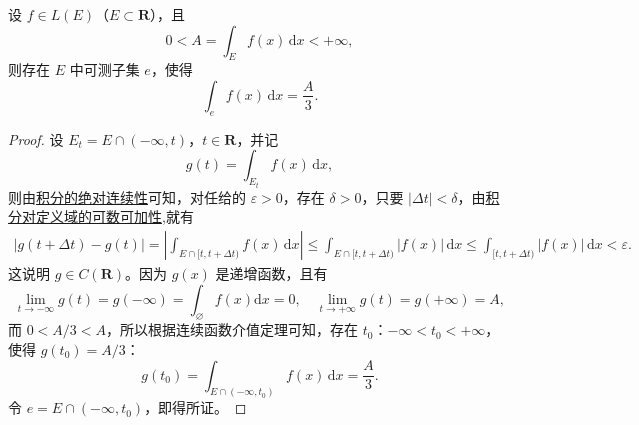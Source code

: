 \documentclass[../../main.tex]{subfiles}
\begin{document}
\begin{corollary}
设 $f \in L(E)$（$E \subset \mathbf{R}$），且
\[
0 < A = \int_E f(x) \, \mathrm{d}x < +\infty,
\]
则存在 $E$ 中可测子集 $e$，使得
\[
\int_e f(x) \, \mathrm{d}x = \frac{A}{3}.
\]
\end{corollary}
\begin{proof}
设 $E_t = E \cap (-\infty, t)$，$t \in \mathbf{R}$，并记
\[
g(t) = \int_{E_t} f(x) \, \mathrm{d}x,
\]
则由\hyperref[theorem:积分的绝对连续性]{积分的绝对连续性}可知，对任给的 $\varepsilon > 0$，存在 $\delta > 0$，只要 $|\Delta t| < \delta$，由\hyperref[theorem:积分对定义域的可数可加性]{积分对定义域的可数可加性},就有
\begin{align*}
|g(t+\Delta t)-g(t)|=\left| \int_{E\cap [t,t+\Delta t)}{f\left( x \right) \,\mathrm{d}x} \right|\leqslant \int_{E\cap [t,t+\Delta t)}{|f(x)|\,\mathrm{d}x}\leqslant \int_{[t,t+\Delta t)}{|f(x)|\,\mathrm{d}x}<\varepsilon .
\end{align*}
这说明 $g \in C(\mathbf{R})$。因为 $g(x)$ 是递增函数，且有
\[
\lim_{t\rightarrow -\infty} g(t)=g\left( -\infty \right) =\int_{\varnothing}{f\left( x \right) \mathrm{d}x}=0,\quad \lim_{t\rightarrow +\infty} g(t)=g\left( +\infty \right) =A,
\]
而 $0 < A/3 < A$，所以根据连续函数介值定理可知，存在 $t_0$：$-\infty < t_0 < +\infty$，使得 $g(t_0) = A/3$：
\[
g(t_0) = \int_{E \cap (-\infty, t_0)} f(x) \, \mathrm{d}x = \frac{A}{3}.
\]
令 $e = E \cap (-\infty, t_0)$，即得所证。

\end{proof}
\end{document}
